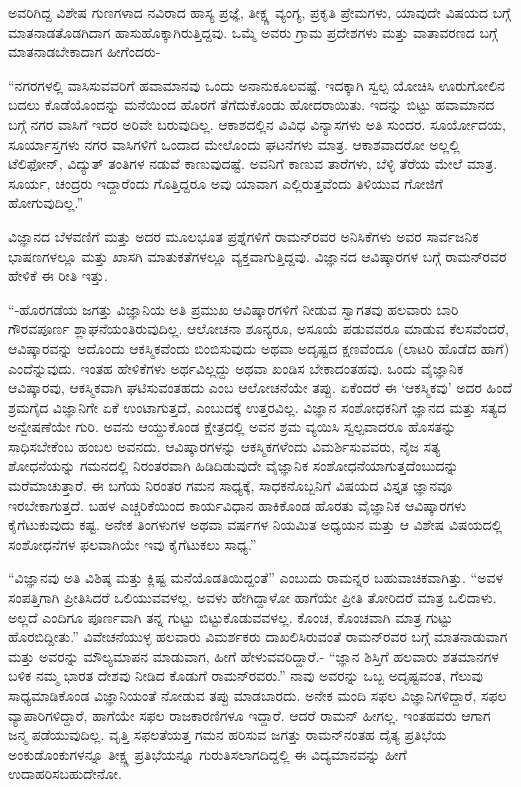 ಅವರಿಗಿದ್ದ ವಿಶೇಷ ಗುಣಗಳಾದ ನವಿರಾದ ಹಾಸ್ಯ ಪ್ರಜ್ಞೆ, ತೀಕ್ಷ್ಣ ವ್ಯಂಗ್ಯ, ಪ್ರಕೃತಿ ಪ್ರೇಮಗಳು, ಯಾವುದೇ ವಿಷಯದ ಬಗ್ಗೆ ಮಾತನಾಡತೊಡಗಿದಾಗ ಹಾಸುಹೊಕ್ಕಾಗಿರುತ್ತಿದ್ದವು. ಒಮ್ಮೆ ಅವರು ಗ್ರಾಮ ಪ್ರದೇಶಗಳು ಮತ್ತು ವಾತಾವರಣದ ಬಗ್ಗೆ ಮಾತನಾಡಬೇಕಾದಾಗ ಹೀಗೆಂದರು-

“ನಗರಗಳಲ್ಲಿ ವಾಸಿಸುವವರಿಗೆ ಹವಾಮಾನವು ಒಂದು ಅನಾನುಕೂಲವಷ್ಟೆ. ಇದಕ್ಕಾಗಿ ಸ್ವಲ್ಪ ಯೋಚಿಸಿ ಊರುಗೋಲಿನ ಬದಲು ಕೊಡೆಯೊಂದನ್ನು ಮನೆಯಿಂದ ಹೊರಗೆ ತೆಗೆದುಕೊಂಡು ಹೋದರಾಯಿತು. ಇದನ್ನು ಬಿಟ್ಟು ಹವಾಮಾನದ ಬಗ್ಗೆ ನಗರ ವಾಸಿಗೆ ಇದರ ಅರಿವೇ ಬರುವುದಿಲ್ಲ. ಆಕಾಶದಲ್ಲಿನ ವಿವಿಧ ವಿನ್ಯಾಸಗಳು ಅತಿ ಸುಂದರ. ಸೂರ್ಯೋದಯ, ಸೂರ್ಯಾಸ್ತಗಳು ನಗರ ವಾಸಿಗಳಿಗೆ ಒಂದಾದ ಮೇಲೊಂದು ಘಟನೆಗಳು ಮಾತ್ರ. ಆಕಾಶವಾದರೋ ಅಲ್ಲಲ್ಲಿ ಟೆಲಿಫೋನ್, ವಿದ್ಯುತ್ ತಂತಿಗಳ ನಡುವೆ ಕಾಣುವುದಷ್ಟೆ. ಅವನಿಗೆ ಕಾಣುವ ತಾರೆಗಳು, ಬೆಳ್ಳಿ ತೆರೆಯ ಮೇಲೆ ಮಾತ್ರ. ಸೂರ್ಯ, ಚಂದ್ರರು ಇದ್ದಾರೆಂದು ಗೊತ್ತಿದ್ದರೂ ಅವು ಯಾವಾಗ ಎಲ್ಲಿರುತ್ತವೆಂದು ತಿಳಿಯುವ ಗೋಜಿಗೆ ಹೋಗುವುದಿಲ್ಲ.”

ವಿಜ್ಞಾನದ ಬೆಳವಣಿಗೆ ಮತ್ತು ಅದರ ಮೂಲಭೂತ ಪ್ರಶ್ನೆಗಳಿಗೆ ರಾಮನ್‍ರವರ ಅನಿಸಿಕೆಗಳು ಅವರ ಸಾರ್ವಜನಿಕ ಭಾಷಣಗಳಲ್ಲೂ ಮತ್ತು ಖಾಸಗಿ ಮಾತುಕತೆಗಳಲ್ಲೂ ವ್ಯಕ್ತವಾಗುತ್ತಿದ್ದವು. ವಿಜ್ಞಾನದ ಆವಿಷ್ಕಾರಗಳ ಬಗ್ಗೆ ರಾಮನ್‍ರವರ ಹೇಳಿಕೆ ಈ ರೀತಿ ಇತ್ತು.

“-ಹೊರಗಡೆಯ ಜಗತ್ತು ವಿಜ್ಞಾನಿಯ ಅತಿ ಪ್ರಮುಖ ಆವಿಷ್ಕಾರಗಳಿಗೆ ನೀಡುವ ಸ್ವಾಗತವು ಹಲವಾರು ಬಾರಿ ಗೌರವಪೂರ್ಣ ಶ್ಲಾಘನೆಯಂತಿರುವುದಿಲ್ಲ. ಆಲೋಚನಾ ಶೂನ್ಯರೂ, ಅಸೂಯೆ ಪಡುವವರೂ ಮಾಡುವ ಕೆಲಸವೆಂದರೆ, ಆವಿಷ್ಕಾರವನ್ನು ಅದೊಂದು ಆಕಸ್ಮಿಕವೆಂದು ಬಿಂಬಿಸುವುದು ಅಥವಾ ಅದೃಷ್ಟದ ಕ್ಷಣವೆಂದೂ (ಲಾಟರಿ ಹೊಡೆದ ಹಾಗೆ) ಎಂದೆನ್ನುವುದು. ಇಂತಹ ಹೇಳಿಕೆಗಳು ಅರ್ಥವಿಲ್ಲದ್ದು ಅಥವಾ ಖಂಡಿಸ ಬೇಕಾದಂತಹವು. ಒಂದು ವೈಜ್ಞಾನಿಕ ಆವಿಷ್ಕಾರವು, ಆಕಸ್ಮಿಕವಾಗಿ ಘಟಿಸುವಂತಹದು ಎಂಬ ಆಲೋಚನೆಯೇ ತಪ್ಪು. ಏಕೆಂದರೆ ಈ ‘ಆಕಸ್ಮಿಕವು’ ಅದರ ಹಿಂದೆ ಶ್ರಮಗೈದ ವಿಜ್ಞಾನಿಗೇ ಏಕೆ ಉಂಟಾಗುತ್ತದೆ, ಎಂಬುದಕ್ಕೆ ಉತ್ತರವಿಲ್ಲ. ವಿಜ್ಞಾನ ಸಂಶೋಧಕನಿಗೆ ಜ್ಞಾನದ ಮತ್ತು ಸತ್ಯದ ಅನ್ವೇಷಣೆಯೇ ಗುರಿ. ಅವನು ಆಯ್ದುಕೊಂಡ ಕ್ಷೇತ್ರದಲ್ಲಿ ಅವನ ಶ್ರಮ ವ್ಯಯಿಸಿ ಸ್ವಲ್ಪವಾದರೂ ಹೊಸತನ್ನು ಸಾಧಿಸಬೇಕೆಂಬ ಹಂಬಲ ಅವನದು. ಆವಿಷ್ಕಾರಗಳನ್ನು ಆಕಸ್ಮಿಕಗಳೆಂದು ವಿಮರ್ಶಿಸುವವರು, ನೈಜ ಸತ್ಯ ಶೋಧನೆಯನ್ನು ಗಮನದಲ್ಲಿ ನಿರಂತರವಾಗಿ ಹಿಡಿದಿಡುವುದೇ ವೈಜ್ಞಾನಿಕ ಸಂಶೋಧನೆಯಾಗುತ್ತದೆಂಬುದನ್ನು ಮರೆಮಾಚುತ್ತಾರೆ. ಈ ಬಗೆಯ ನಿರಂತರ ಗಮನ ಸಾಧ್ಯಕ್ಕೆ, ಸಾಧಕನೊಬ್ಬನಿಗೆ ವಿಷಯದ ವಿಸ್ತೃತ ಜ್ಞಾನವೂ ಇರಬೇಕಾಗುತ್ತದೆ. ಬಹಳ ಎಚ್ಚರಿಕೆಯಿಂದ ಕಾರ್ಯವಿಧಾನ ಹಾಕಿಕೊಂಡ ಹೊರತು ವೈಜ್ಞಾನಿಕ ಆವಿಷ್ಕಾರಗಳು ಕೈಗೆಟುಕುವುದು ಕಷ್ಟ. ಅನೇಕ ತಿಂಗಳುಗಳ ಅಥವಾ ವರ್ಷಗಳ ನಿಯಮಿತ ಅಧ್ಯಯನ ಮತ್ತು ಆ ವಿಶೇಷ ವಿಷಯದಲ್ಲಿ ಸಂಶೋಧನೆಗಳ ಫಲವಾಗಿಯೇ ಇವು ಕೈಗೆಟುಕಲು ಸಾಧ್ಯ.”

“ವಿಜ್ಞಾನವು ಅತಿ ವಿಶಿಷ್ಠ ಮತ್ತು ಕ್ಲಿಷ್ಟ ಮನೆಯೊಡತಿಯಿದ್ದಂತೆ” ಎಂಬುದು ರಾಮನ್ನರ ಬಹುವಾಚಿಕವಾಗಿತ್ತು. “ಅವಳ ಸಂಪತ್ತಿಗಾಗಿ ಪ್ರೀತಿಸಿದರೆ ಒಲಿಯುವವಳಲ್ಲ. ಅವಳು ಹೇಗಿದ್ದಾಳೋ ಹಾಗೆಯೇ ಪ್ರೀತಿ ತೋರಿದರೆ ಮಾತ್ರ ಒಲಿದಾಳು. ಅಲ್ಲದೆ ಎಂದಿಗೂ ಪೂರ್ಣವಾಗಿ ತನ್ನ ಗುಟ್ಟು ಬಿಟ್ಟುಕೊಡುವವಳಲ್ಲ. ಕೊಂಚ, ಕೊಂಚವಾಗಿ ಮಾತ್ರ ಗುಟ್ಟು ಹೊರಬಿದ್ದೀತು.” ವಿವೇಚನೆಯುಳ್ಳ ಹಲವಾರು ವಿಮರ್ಶಕರು ದಾಖಲಿಸಿರುವಂತೆ ರಾಮನ್‍ರವರ ಬಗ್ಗೆ ಮಾತನಾಡುವಾಗ ಮತ್ತು ಅವರನ್ನು ಮೌಲ್ಯಮಾಪನ ಮಾಡುವಾಗ, ಹೀಗೆ ಹೇಳುವವರಿದ್ದಾರೆ.- “ಜ್ಞಾನ ಶಿಸ್ತಿಗೆ ಹಲವಾರು ಶತಮಾನಗಳ ಬಳಿಕ ನಮ್ಮ ಭಾರತ ದೇಶವು ನೀಡಿದ ಕೊಡುಗೆ ರಾಮನ್‍ರವರು.” ನಾವು ಅವರನ್ನು ಒಬ್ಬ ಅದೃಷ್ಟವಂತ, ಗೆಲುವು ಸಾಧ್ಯಮಾಡಿಕೊಂಡ ವಿಜ್ಞಾನಿಯಂತೆ ನೋಡುವ ತಪ್ಪು ಮಾಡಬಾರದು. ಅನೇಕ ಮಂದಿ ಸಫಲ ವಿಜ್ಞಾನಿಗಳಿದ್ದಾರೆ, ಸಫಲ ವ್ಯಾಪಾರಿಗಳಿದ್ದಾರೆ, ಹಾಗೆಯೇ ಸಫಲ ರಾಜಕಾರಣಿಗಳೂ ಇದ್ದಾರೆ. ಆದರೆ ರಾಮನ್ ಹೀಗಲ್ಲ. ಇಂತಹವರು ಆಗಾಗ ಜನ್ಮ ಪಡೆಯುವುದಿಲ್ಲ. ವೃತ್ತಿ ಸಫಲತೆಯತ್ತ ಗಮನ ಹರಿಸುವ ಜಗತ್ತು ರಾಮನ್‌ನಂತಹ ದೈತ್ಯ ಪ್ರತಿಭೆಯ ಅಂಕುಡೊಂಕುಗಳನ್ನೂ ತೀಕ್ಷ್ಣ ಪ್ರತಿಭೆಯನ್ನೂ ಗುರುತಿಸಲಾಗದಿದ್ದಲ್ಲಿ ಈ ವಿದ್ಯಮಾನವನ್ನು ಹೀಗೆ ಉದಾಹರಿಸಬಹುದೇನೋ.

